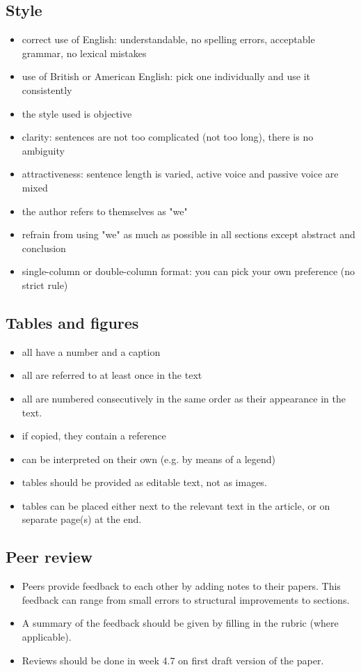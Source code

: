 \subsection{Style}
\begin{itemize}
\item correct use of English: understandable, no spelling errors, acceptable grammar, no lexical mistakes 
\item use of British or American English: pick one individually and use it consistently
\item the style used is objective
\item clarity: sentences are not too complicated (not too long), there is no ambiguity
\item attractiveness: sentence length is varied, active voice and passive voice are mixed
\item the author refers to themselves as "we"
\item refrain from using "we" as much as possible in all sections except abstract and conclusion
\item single-column or double-column format: you can pick your own preference (no strict rule)
\end{itemize}

\subsection{Tables and figures}
\begin{itemize}
\item all have a number and a caption
\item all are referred to at least once in the text
\item all are numbered consecutively in the same order as their appearance in the text.
\item if copied, they contain a reference
\item can be interpreted on their own (e.g. by means of a legend)
\item tables should be provided as editable text, not as images.
\item tables can be placed either next to the relevant text in the article, or on separate page(s) at the end.
\end{itemize}

\subsection{Peer review}
\begin{itemize}
\item Peers provide feedback to each other by adding notes to their papers. This feedback can range from small errors to structural improvements to sections. 
\item A summary of the feedback should be given by filling in the rubric (where applicable).
\item Reviews should be done in week 4.7 on first draft version of the paper.
\end{itemize}
